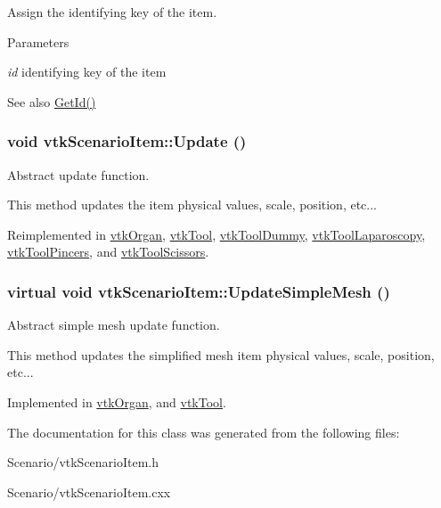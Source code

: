 Assign the identifying key of the item. 


\begin{DoxyParams}{Parameters}
\item[{\em id}]identifying key of the item \end{DoxyParams}
\begin{DoxySeeAlso}{See also}
\hyperlink{classvtkScenarioItem_a9884061bd42ee058291d95a67ddcac20}{GetId()} 
\end{DoxySeeAlso}
\hypertarget{classvtkScenarioItem_ad29b7f2958399100f919b4eb9627fbc1}{
\subsubsection[{Update}]{\setlength{\rightskip}{0pt plus 5cm}void vtkScenarioItem::Update ()}}
\label{classvtkScenarioItem_ad29b7f2958399100f919b4eb9627fbc1}


Abstract update function. 

This method updates the item physical values, scale, position, etc... 

Reimplemented in \hyperlink{classvtkOrgan_a267da8ba8d4cfcef50b70dc5b9d19ae9}{vtkOrgan}, \hyperlink{classvtkTool_a0f1b6e049d7ff5420f4f4604434a9da7}{vtkTool}, \hyperlink{classvtkToolDummy_a19cda726ffda0a3955e519d7b42e4882}{vtkToolDummy}, \hyperlink{classvtkToolLaparoscopy_a4445a0cfabd77b50a06929b04cb71f9e}{vtkToolLaparoscopy}, \hyperlink{classvtkToolPincers_a57986aee2bcfa04472410cd7bf5c7929}{vtkToolPincers}, and \hyperlink{classvtkToolScissors_afe574b6b9e809f746308a157b6525c4b}{vtkToolScissors}.

\hypertarget{classvtkScenarioItem_a75b837f36e8f79f51999dc1a7eecbe4b}{
\subsubsection[{UpdateSimpleMesh}]{\setlength{\rightskip}{0pt plus 5cm}virtual void vtkScenarioItem::UpdateSimpleMesh ()}}
\label{classvtkScenarioItem_a75b837f36e8f79f51999dc1a7eecbe4b}


Abstract simple mesh update function. 

This method updates the simplified mesh item physical values, scale, position, etc... 

Implemented in \hyperlink{classvtkOrgan_a943994fbb1b4f8a8e72f647f631cdd81}{vtkOrgan}, and \hyperlink{classvtkTool_ac44896d171f0512b821f7ab031f7fed7}{vtkTool}.



The documentation for this class was generated from the following files:\begin{DoxyCompactItemize}
\item 
Scenario/vtkScenarioItem.h\item 
Scenario/vtkScenarioItem.cxx\end{DoxyCompactItemize}
